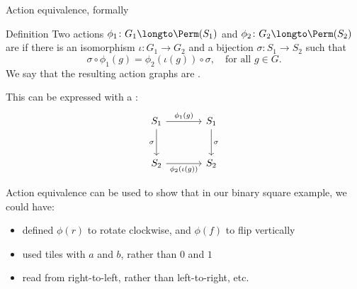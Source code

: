 \documentclass[8pt, handout]{beamer}
\newcommand{\Pause}{}      %
\begin{document}
\begin{frame}[fragile]{Action equivalence, formally} 
  
  \begin{block}{Definition}
    Two actions $\phi_1\colon G_1\longto\Perm(S_1)$ and $\phi_2\colon
    G_2\longto\Perm(S_2)$ are  if there is an
    isomorphism $\iota\colon G_1\to G_2$ and a bijection $\sigma\colon
    S_1\to S_2$ such that
    \[
    \sigma\circ\phi_1(g)=\phi_2(\iota(g))\circ\sigma,\quad \text{for
      all $g\in G$.}
    \]
    \Pause We say that the resulting action graphs are .
  \end{block}
  
  \medskip\Pause
  
  This can be expressed with a :
  \[
  \begin{tikzcd}[column sep=large,row sep=large]
    S_1 \arrow{r}{\phi_1(g)} \arrow{d}[swap]{\sigma} & S_1 \arrow{d}{\sigma} \\
    S_2 \arrow[swap]{r}{\phi_2(\iota(g))} & S_2
  \end{tikzcd}
  \]
  
  \Pause
  
  Action equivalence can be used to show that in our binary square
  example, we could have:
  \begin{itemize}
  \item defined $\phi(r)$ to rotate clockwise, and $\phi(f)$ to flip
    vertically \Pause
  \item used tiles with $a$ and $b$, rather than $0$ and $1$ \Pause
  \item read from right-to-left, rather than left-to-right, etc. \Pause
  \end{itemize}
  
\end{frame}

\end{document}
